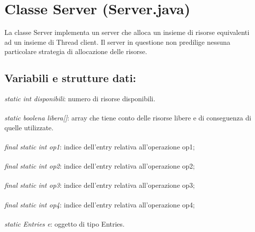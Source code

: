 \documentclass[10pt, a4paper]{article}
\begin{document}
\section{Classe Server (Server.java)}
La classe Server implementa un server che alloca un insieme di risorse equivalenti ad un insieme di Thread client. Il server in questione non predilige nessuna particolare strategia di allocazione delle risorse.
\subsection{Variabili e strutture dati:}
\textit{static int disponibili}: numero di risorse disponibili.
\\\\
\textit{static boolena libera[]}: array che tiene conto delle risorse libere e di conseguenza di quelle utilizzate.
\\\\
\textit{final static int op1}: indice dell'entry relativa all'operazione op1;
\\\\
\textit{final static int op2}: indice dell'entry relativa all'operazione op2;
\\\\
\textit{final static int op3}: indice dell'entry relativa all'operazione op3;
\\\\
\textit{final static int op4}: indice dell'entry relativa all'operazione op4;
\\\\
\textit{static Entries e}: oggetto di tipo Entries.
\end{document}
